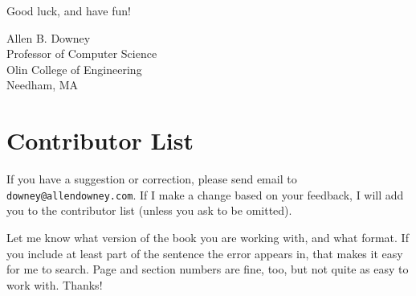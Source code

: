 \documentclass[12pt]{book}
\theoremstyle{exercise}
\begin{document}
Good luck, and have fun!


\begin{flushleft}
Allen B. Downey \\

Professor of Computer Science \\

Olin College of Engineering \\

Needham, MA
\end{flushleft}


\section*{Contributor List}


If you have a suggestion or correction, please send email to
{\tt downey@allendowney.com}.  If I make a change based on your
feedback, I will add you to the contributor list
(unless you ask to be omitted).

Let me know what version of the book you are working with, and
what format.  If you include at least part of the sentence the
error appears in, that makes it easy for me to search.  Page and
section numbers are fine, too, but not quite as easy to work with.
Thanks!

\small
\end{document}
